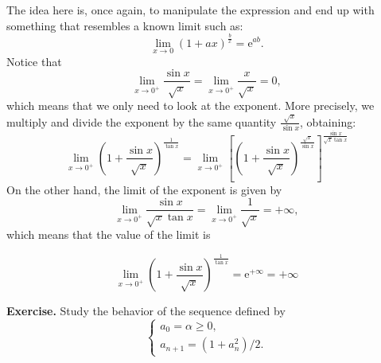 \documentclass[a4paper,10 pt]{report}
\newcommand{\finalanswer}[1]{%
    \begin{finalAnswer}
    \[
        #1
    \]
    \end{finalAnswer}
}
\theoremstyle{definition}
\begin{document}
\begin{solutionBox} The idea here is, once again, to manipulate the expression and end up with something that resembles a known limit such as:
\begin{equation*} \lim_{x \to 0} \left(1 + a x \right)^{\frac{b}{x}} = \mathrm{e}^{ab}.\end{equation*}
Notice that
\begin{equation*} \lim_{x \to 0^+} \frac{\sin x}{\sqrt{x}} = \lim_{x \to 0^+} \frac{x}{\sqrt{x}} = 0, \end{equation*}
which means that we only need to look at the exponent. More precisely, we multiply and divide the exponent by the same quantity $\frac{\sqrt{x}}{\sin x}$, obtaining:
\begin{equation*} \lim_{x \to 0^+} \left( 1 + \frac{\sin x}{\sqrt{x}} \right)^{ \frac{1}{\tan x} } = \lim_{x \to 0^+} \left[\left( 1 + \frac{\sin x}{\sqrt{x}} \right)^{ \frac{\sqrt{x}}{\sin x} } \right]^{\frac{\sin x}{ \sqrt{x} \tan x}} \end{equation*}
On the other hand, the limit of the exponent is given by
\begin{equation*} \lim_{x \to 0^+} \frac{\sin x}{ \sqrt{x} \tan x} = \lim_{x \to 0^+} \frac{1}{\sqrt{x}} = + \infty, \end{equation*}
which means that the value of the limit is
\finalanswer{\lim_{x \to 0^+} \left( 1 + \frac{\sin x}{\sqrt{x}} \right)^{ \frac{1}{\tan x} } = \mathrm{e}^{+ \infty} = + \infty}
\end{solutionBox}

\begin{exerciseBox}\textbf{Exercise.} Study the behavior of the sequence defined by
\begin{equation}\label{seq.1} \begin{cases} a_0 = \alpha \geq 0, \\ a_{n + 1} = (1+a_n^2)/2. \end{cases} \end{equation}
\end{exerciseBox}
\end{document}
